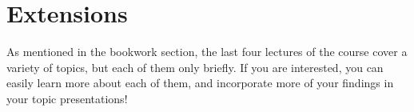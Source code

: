 \documentclass[12pt,a4paper,oneside,openright]{report}
\newcommand{\question}[2]{\paragraph{#1} #2}
\begin{document}


\section{Extensions}

As mentioned in the bookwork section, the last four lectures of the
course cover a variety of topics, but each of them only briefly. If
you are interested, you can easily learn more about each of them, and
incorporate more of your findings in your topic presentations!




\end{document}
